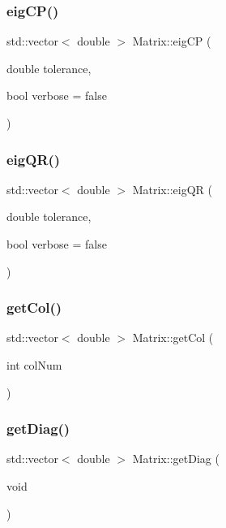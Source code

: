 \mbox{\label{class_matrix_a2df4b81dc518abc9fcd6896e2dafdff0}} 
\subsubsection{\texorpdfstring{eig\+C\+P()}{eigCP()}}
{\footnotesize\ttfamily std\+::vector$<$ double $>$ Matrix\+::eig\+CP (\begin{DoxyParamCaption}\item[{double}]{tolerance,  }\item[{bool}]{verbose = {\ttfamily false} }\end{DoxyParamCaption})}

\mbox{\label{class_matrix_adcb3d7e342e79b4d667860ffbf9811a1}} 
\subsubsection{\texorpdfstring{eig\+Q\+R()}{eigQR()}}
{\footnotesize\ttfamily std\+::vector$<$ double $>$ Matrix\+::eig\+QR (\begin{DoxyParamCaption}\item[{double}]{tolerance,  }\item[{bool}]{verbose = {\ttfamily false} }\end{DoxyParamCaption})}

\mbox{\label{class_matrix_a01b08c4fed1a9f7e80467e613cfc8c9e}} 
\subsubsection{\texorpdfstring{get\+Col()}{getCol()}}
{\footnotesize\ttfamily std\+::vector$<$ double $>$ Matrix\+::get\+Col (\begin{DoxyParamCaption}\item[{int}]{col\+Num }\end{DoxyParamCaption})}

\mbox{\label{class_matrix_adc0504b22f3d95218b5e754890f0db3e}} 
\subsubsection{\texorpdfstring{get\+Diag()}{getDiag()}}
{\footnotesize\ttfamily std\+::vector$<$ double $>$ Matrix\+::get\+Diag (\begin{DoxyParamCaption}\item[{void}]{ }\end{DoxyParamCaption})}

